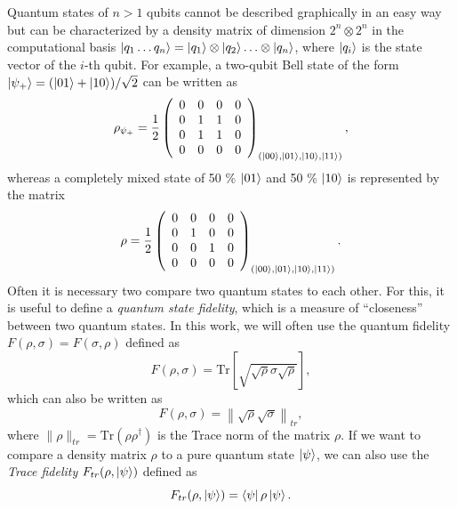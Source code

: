 \smallskip

Quantum states of $n>1$ qubits cannot be described graphically in an easy way but can be characterized by a density matrix of dimension $2^n\otimes 2^n$ in the computational basis $\left| q_1\hdots q_n \right>=\left| q_1 \right>\otimes\left| q_{2} \right>\hdots\otimes\left| q_n \right>$, where $\left| q_i \right>$ is the state vector of the $i$-th qubit. For example, a two-qubit Bell state of the form $\left| \psi_+ \right>=(\left| 01 \right>+\left| 10 \right>)/\sqrt{2}$ can be written as
%
\begin{equation}
\rho_{\psi_+} = \frac{1}{2}\left( \begin{array}{cccc} 0 & 0 & 0 & 0 \\ 0 & 1 & 1 & 0 \\ 0 & 1 & 1 & 0 \\ 0 & 0 & 0 & 0 \end{array} \right)_{(\left| 00 \right>,\left| 01 \right>,\left| 10 \right>,\left| 11 \right>)},
\end{equation}
%
whereas a completely mixed state of 50 \% $\left| 01 \right>$ and 50 \% $\left| 10 \right>$ is represented by the matrix
%
\begin{equation}
\rho = \frac{1}{2}\left( \begin{array}{cccc} 0 & 0 & 0 & 0 \\ 0 & 1 & 0 & 0 \\ 0 & 0 & 1 & 0 \\ 0 & 0 & 0 & 0 \end{array} \right)_{(\left| 00 \right>,\left| 01 \right>,\left| 10 \right>,\left| 11 \right>)}.
\end{equation}
%
Often it is necessary two compare two quantum states to each other. For this, it is useful to define a {\it quantum state fidelity}, which is a measure of ``closeness'' between two quantum states. In this work, we will often use the quantum fidelity $F(\rho,\sigma)=F(\sigma,\rho)$ defined as
%
\begin{equation}
F(\rho,\sigma) = \mathrm{Tr}\left[\sqrt{\sqrt{\rho}\sigma\sqrt{\rho}}\right], \label{eq:quantum_state_fidelity}
\end{equation}
%
which can also be written as
%
\begin{equation}
F(\rho,\sigma) = \left\|\sqrt{\rho}\sqrt{\sigma}\right\|_{tr},
\end{equation}
%
where $\|\rho\|_{tr}=\mathrm{Tr}(\rho\rho^\dagger)$ is the Trace norm of the matrix $\rho$. If we want to compare a density matrix $\rho$ to a pure quantum state $\left| \psi \right>$, we can also use the {\it Trace fidelity} $F_{tr}(\rho,\left| \psi \right>)$ defined as
%
\begin{equation}
F_{tr}(\rho,\left| \psi \right>) = \left< \psi \right|\rho\left| \psi \right>. \label{eq:quantum_trace_fidelity}
\end{equation}
%
